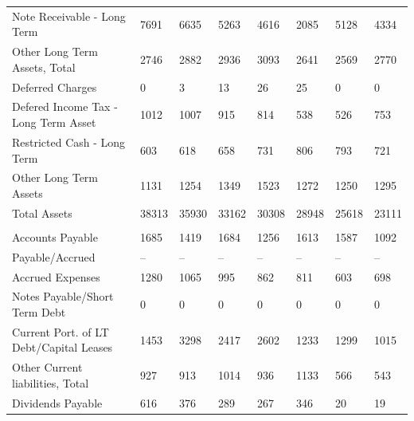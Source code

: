 \documentclass[grad,numbers]{coppe}
\begin{document}
\begin{longtable}[t]{llllllll}
  \hspace{1em}Note Receivable - Long Term & 7691 & 6635 & 5263 & 4616 & 2085 & 5128 & 4334\\
  \hspace{1em}Other Long Term Assets, Total & 2746 & 2882 & 2936 & 3093 & 2641 & 2569 & 2770\\
  \hspace{1em}\hspace{1em}Deferred Charges & 0 & 3 & 13 & 26 & 25 & 0 & 0\\
  \hspace{1em}\hspace{1em}Defered Income Tax - Long Term Asset & 1012 & 1007 & 915 & 814 & 538 & 526 & 753\\
  \hspace{1em}\hspace{1em}Restricted Cash - Long Term & 603 & 618 & 658 & 731 & 806 & 793 & 721\\
  \hspace{1em}\hspace{1em}Other Long Term Assets & 1131 & 1254 & 1349 & 1523 & 1272 & 1250 & 1295\\
  \hspace{1em}Total Assets & 38313 & 35930 & 33162 & 30308 & 28948 & 25618 & 23111\\
  \addlinespace[0.3em]
  \multicolumn{8}{l}{\textbf{Liabilities}}\\
  \hspace{1em}Accounts Payable & 1685 & 1419 & 1684 & 1256 & 1613 & 1587 & 1092\\
  \hspace{1em}Payable/Accrued & -- & -- & -- & -- & -- & -- & --\\
  \hspace{1em}Accrued Expenses & 1280 & 1065 & 995 & 862 & 811 & 603 & 698\\
  \hspace{1em}Notes Payable/Short Term Debt & 0 & 0 & 0 & 0 & 0 & 0 & 0\\
  \hspace{1em}Current Port. of LT Debt/Capital Leases & 1453 & 3298 & 2417 & 2602 & 1233 & 1299 & 1015\\
  \hspace{1em}Other Current liabilities, Total & 927 & 913 & 1014 & 936 & 1133 & 566 & 543\\
  \hspace{1em}\hspace{1em}Dividends Payable & 616 & 376 & 289 & 267 & 346 & 20 & 19\\

\end{longtable}
\end{document}
